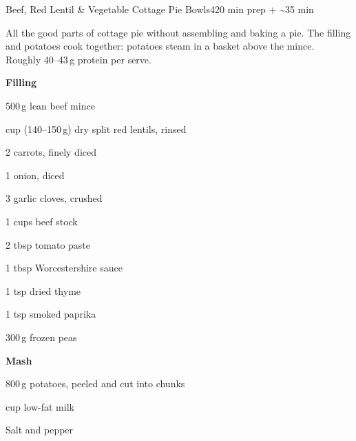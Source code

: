 \begin{recipebox}{Beef, Red Lentil \& Vegetable Cottage Pie Bowls}{4}{20 min prep + \textasciitilde35 min}

All the good parts of cottage pie without assembling and baking a pie. The
filling and potatoes cook together: potatoes steam in a basket above the mince.
Roughly 40--43\,g protein per serve.

\begin{ingredients}
  \item[] \textbf{Filling}
  \item 500\,g lean beef mince
  \item {} cup (140--150\,g) dry split red lentils, rinsed
  \item 2 carrots, finely diced
  \item 1 onion, diced
  \item 3 garlic cloves, crushed
  \item 1 cups beef stock
  \item 2 tbsp tomato paste
  \item 1 tbsp Worcestershire sauce
  \item 1 tsp dried thyme
  \item 1 tsp smoked paprika
  \item 300\,g frozen peas
  \item[] \textbf{Mash}
  \item 800\,g potatoes, peeled and cut into chunks
  \item {} cup low-fat milk
  \item Salt and pepper
\end{ingredients}


\end{recipebox}
